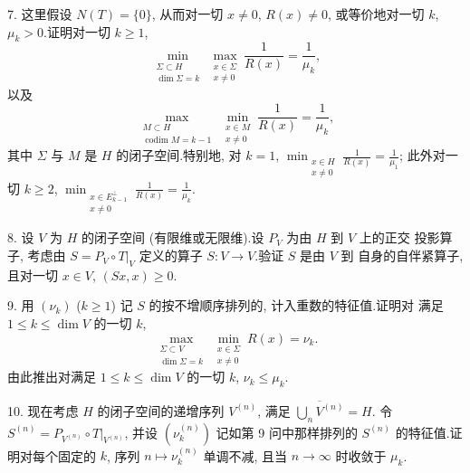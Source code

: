 \begin{problem}
7. 这里假设 $N(T)=\{0\}$, 从而对一切 $x\ne0$, $R(x)\ne0$, 或等价地对一切 $k$,
$\mu_k>0$.证明对一切 $k\ge1$,
\begin{equation*}
\min_{\substack{\Sigma\subset H\\\dim\Sigma=k}}\max_{\substack{x\in\Sigma\\x\ne0}}\frac{1}{R(x)}=\frac{1}{\mu_k},
\end{equation*}
以及
\begin{equation*}
\max_{\substack{M\subset H\\\operatorname{codim}M=k-1}}\min_{\substack{x\in M\\x\ne0}}\frac{1}{R(x)}=\frac{1}{\mu_k},
\end{equation*}
其中 $\Sigma$ 与 $M$ 是 $H$ 的闭子空间.特别地, 对 $k=1$,
$\min_{\substack{x\in H\\x\ne0}}\frac{1}{R(x)}=\frac{1}{\mu_1}$; 此外对一切 $k\ge2$,
$\min_{\substack{x\in E_{k-1}^\perp\\x\ne0}}\frac{1}{R(x)}=\frac{1}{\mu_k}$.

8. 设 $V$ 为 $H$ 的闭子空间 (有限维或无限维).设 $P_V$ 为由 $H$ 到 $V$ 上的正交
投影算子, 考虑由 $S=P_V\circ T|_V$ 定义的算子 $S:V\to V$.验证 $S$ 是由 $V$ 到
自身的自伴紧算子, 且对一切 $x\in V$, $(Sx,x)\ge0$.

9. 用 $(\nu_k)$ ($k\ge1$) 记 $S$ 的按不增顺序排列的, 计入重数的特征值.证明对
满足 $1\le k\le\dim V$ 的一切 $k$,
\begin{equation*}
\max_{\substack{\Sigma\subset V\\\dim\Sigma=k}}\min_{\substack{x\in\Sigma\\x\ne0}}R(x)=\nu_k.
\end{equation*}
由此推出对满足 $1\le k\le\dim V$ 的一切 $k$, $\nu_k\le\mu_k$.

10. 现在考虑 $H$ 的闭子空间的递增序列 $V^{(n)}$, 满足 $\overline{\bigcup_nV^{(n)}}=H$.
令 $S^{(n)}=P_{V^{(n)}}\circ T|_{V^{(n)}}$, 并设 $(\nu_k^{(n)})$ 记如第 9 问中那样排列的
$S^{(n)}$ 的特征值.证明对每个固定的 $k$, 序列 $n\mapsto\nu_k^{(n)}$ 单调不减, 且当
$n\to\infty$ 时收敛于 $\mu_k$.
\end{problem}

